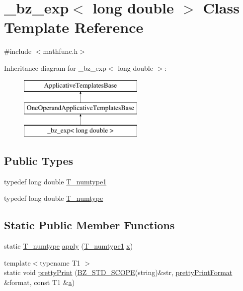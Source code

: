 \hypertarget{class__bz__exp_3_01long_01double_01_4}{}\section{\+\_\+bz\+\_\+exp$<$ long double $>$ Class Template Reference}
\label{class__bz__exp_3_01long_01double_01_4}


{\ttfamily \#include $<$mathfunc.\+h$>$}

Inheritance diagram for \+\_\+bz\+\_\+exp$<$ long double $>$\+:\begin{figure}[H]
\begin{center}
\leavevmode
\includegraphics[height=3.000000cm]{class__bz__exp_3_01long_01double_01_4}
\end{center}
\end{figure}
\subsection*{Public Types}
\begin{DoxyCompactItemize}
\item 
typedef long double \hyperlink{class__bz__exp_3_01long_01double_01_4_a4baf90a4ab9b7a0cc69648efb953ec4b}{T\+\_\+numtype1}
\item 
typedef long double \hyperlink{class__bz__exp_3_01long_01double_01_4_a36674ebca4f499333a52ab409b04490c}{T\+\_\+numtype}
\end{DoxyCompactItemize}
\subsection*{Static Public Member Functions}
\begin{DoxyCompactItemize}
\item 
static \hyperlink{class__bz__exp_3_01long_01double_01_4_a36674ebca4f499333a52ab409b04490c}{T\+\_\+numtype} \hyperlink{class__bz__exp_3_01long_01double_01_4_aae4334a4d41c1e337cd78297f4544274}{apply} (\hyperlink{class__bz__exp_3_01long_01double_01_4_a4baf90a4ab9b7a0cc69648efb953ec4b}{T\+\_\+numtype1} \hyperlink{vecnorm1_8cc_ac73eed9e41ec09d58f112f06c2d6cb63}{x})
\item 
{\footnotesize template$<$typename T1 $>$ }\\static void \hyperlink{class__bz__exp_3_01long_01double_01_4_aff1e0550432033bc8be7fbed5dc8b85b}{pretty\+Print} (\hyperlink{numinquire_8h_a2b24ffc3b4ef9803956bc7715c6c7b83}{B\+Z\+\_\+\+S\+T\+D\+\_\+\+S\+C\+O\+P\+E}(string)\&str, \hyperlink{classprettyPrintFormat}{pretty\+Print\+Format} \&format, const T1 \&\hyperlink{gen__mat5files_8m_aae328bf20413f220e38aec4d95bfd6da}{a})
\end{DoxyCompactItemize}


